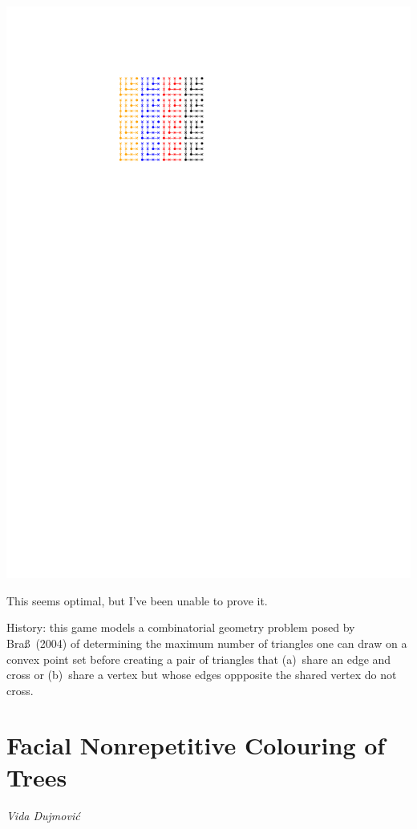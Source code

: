 \documentclass{patmorin}
\begin{document}
\begin{center}
   \includegraphics{figs/game}
\end{center}

This seems optimal, but I've been unable to prove it.

\noindent History: this game models a combinatorial geometry problem
posed by Bra\ss\ (2004) of determining the maximum number of triangles
one can draw on a convex point set before creating a pair of triangles
that (a)~share an edge and cross or (b)~share a vertex but whose edges
oppposite the shared vertex do not cross.

\section{Facial Nonrepetitive Colouring of Trees}

\noindent\emph{Vida Dujmovi\'c}
\end{document}
